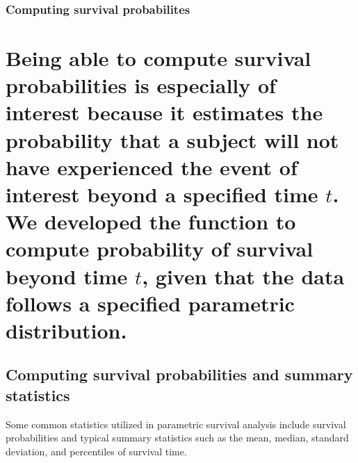\hypertarget{computing-survival-probabilites}{%
\subsubsection{Computing survival
probabilites}\label{computing-survival-probabilites}}

\hypertarget{being-able-to-compute-survival-probabilities-is-especially-of-interest-because-it-estimates-the-probability-that-a-subject-will-not-have-experienced-the-event-of-interest-beyond-a-specified-time-t.-we-developed-the-function-to-compute-probability-of-survival-beyond-time-t-given-that-the-data-follows-a-specified-parametric-distribution.}{%
\section{\texorpdfstring{Being able to compute survival probabilities is
especially of interest because it estimates the probability that a
subject will not have experienced the event of interest beyond a
specified time \(t\). We developed the function  to
compute probability of survival beyond time \(t\), given that the data
follows a specified parametric
distribution.}{Being able to compute survival probabilities is especially of interest because it estimates the probability that a subject will not have experienced the event of interest beyond a specified time t. We developed the function  to compute probability of survival beyond time t, given that the data follows a specified parametric distribution.}}\label{being-able-to-compute-survival-probabilities-is-especially-of-interest-because-it-estimates-the-probability-that-a-subject-will-not-have-experienced-the-event-of-interest-beyond-a-specified-time-t.-we-developed-the-function-to-compute-probability-of-survival-beyond-time-t-given-that-the-data-follows-a-specified-parametric-distribution.}}

\hypertarget{computing-survival-probabilities-and-summary-statistics}{%
\subsection{Computing survival probabilities and summary
statistics}\label{computing-survival-probabilities-and-summary-statistics}}

Some common statistics utilized in parametric survival analysis include
survival probabilities and typical summary statistics such as the mean,
median, standard deviation, and percentiles of survival time.

